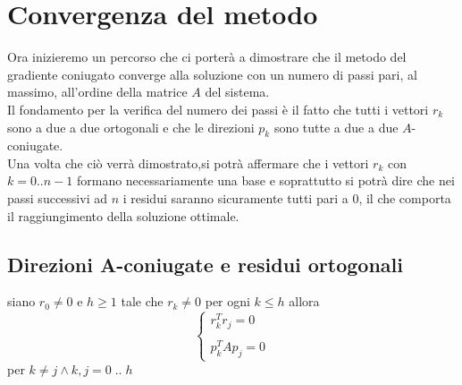 \section{Convergenza del metodo}

Ora inizieremo un percorso che ci porterà a dimostrare che il metodo
del gradiente coniugato converge alla soluzione con un numero di passi
pari, al massimo, all'ordine della matrice $A$ del sistema.\\ Il
fondamento per la verifica del numero dei passi \`e il fatto che tutti i
vettori $r_{k}$ sono a due a due ortogonali e che le direzioni $p_{k}$
sono tutte a due a due $A$-coniugate.\\ Una volta che ciò verrà
dimostrato,si potrà affermare che i vettori $r_{k}$ con $k=0..n-1$
formano necessariamente una base e soprattutto si potrà dire che nei
passi successivi ad $n$ i residui saranno sicuramente tutti pari a 0,
il che comporta il raggiungimento della soluzione ottimale.

\subsection{Direzioni A-coniugate e residui ortogonali}
\begin{theo} siano $r_{0} \neq 0 $ e $h \geq 1$ tale che $r_{k} \neq
0$ per ogni $k \leq h$ allora
$$\left\{
\begin{array}{ll} r_{k}^{T} r_{j} = 0\\ \\ p_{k}^{T} A p_{j} = 0
\end{array} \right.
$$
per $k \neq j \wedge k,j=0\; ..\; h$
\end{theo}

